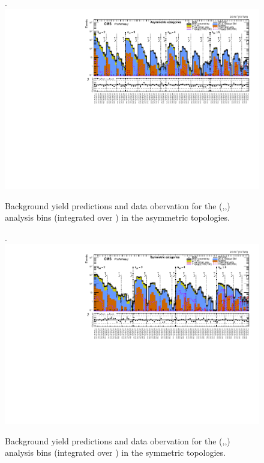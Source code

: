 \clearpage
\begin{landscape}
  \begin{center}
    \begin{figure}[h!]
      \caption{Background yield predictions and data obervation for the (\njet,\nb,\scalht) analysis bins (integrated over \MHT) in the asymmetric topologies. \label{fig:summaryPlot_Asymmetric}}.
      \includegraphics[width=0.8\linewidth]{figures/postFitResults/summaryPlots/summaryPlot_Asymmetric_prefit_overlay_fit_b}
    \end{figure}
  \end{center}
\end{landscape}

\clearpage
\begin{landscape}
  \begin{center}
    \begin{figure}[h!]
      \caption{Background yield predictions and data obervation for the (\njet,\nb,\scalht) analysis bins (integrated over \MHT) in the symmetric topologies. \label{fig:summaryPlot_Symmetric}}.
      \includegraphics[width=0.8\linewidth]{figures/postFitResults/summaryPlots/summaryPlot_Symmetric_prefit_overlay_fit_b}
    \end{figure}
  \end{center}
\end{landscape}





